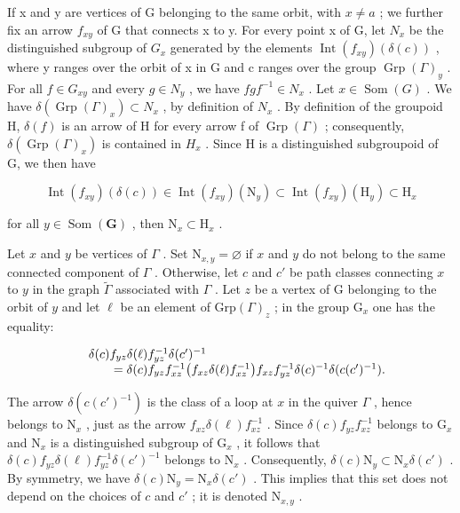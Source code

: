 If x and y are vertices of G belonging to the same orbit, with \(x \neq a\) ; we further fix an arrow \(f_{xy}\) of G that connects x to y. For every point x of G, let \(N_{x}\) be the distinguished subgroup of \(G_{x}\) generated by the elements \(\operatorname{Int}(f_{xy})(\delta(c))\) , where y ranges over the orbit of x in G and c ranges over the group \(\operatorname{Grp}(\Gamma)_{y}\) . For all \(f \in G_{xy}\) and every \(g \in N_{y}\) , we have \(fgf^{-1} \in N_{x}\) . Let \(x \in \operatorname{Som}(G)\) . We have \(\delta(\operatorname{Grp}(\Gamma)_{x}) \subset N_{x}\) , by definition of \(N_{x}\) . By definition of the groupoid H, \(\delta(f)\) is an arrow of H for every arrow f of \(\operatorname{Grp}(\Gamma)\) ; consequently, \(\delta(\operatorname{Grp}(\Gamma)_{x})\) is contained in \(H_{x}\) . Since H is a distinguished subgroupoid of G, we then have

\[
\operatorname{Int} (f _ {x y}) (\delta (c)) \in \operatorname{Int} (f _ {x y}) (\mathrm{N} _ {y}) \subset \operatorname{Int} (f _ {x y}) (\mathrm{H} _ {y}) \subset \mathrm{H} _ {x}
\]

for all \(y \in \operatorname{Som}(\mathbf{G})\) , then \(\mathrm{N}_x \subset \mathrm{H}_x\) .

Let \(x\) and \(y\) be vertices of \(\Gamma\) . Set \(\mathrm{N}_{x,y} = \varnothing\) if \(x\) and \(y\) do not belong to the same connected component of \(\Gamma\) . Otherwise, let \(c\) and \(c'\) be path classes connecting \(x\) to \(y\) in the graph \(\widetilde{\Gamma}\) associated with \(\Gamma\) . Let \(z\) be a vertex of G belonging to the orbit of \(y\) and let \(\ell\) be an element of \(\mathrm{Grp}(\Gamma)_z\) ; in the group \(\mathrm{G}_x\) one has the equality:

\[
\begin{array}{r l} & {\delta (c) f _ {y z} \delta (\ell) f _ {y z} ^ {- 1} \delta (c ^ {\prime}) ^ {- 1}} \\ & {\qquad = \delta (c) f _ {y z} f _ {x z} ^ {- 1} \big (f _ {x z} \delta (\ell) f _ {x z} ^ {- 1} \big) f _ {x z} f _ {y z} ^ {- 1} \delta (c) ^ {- 1} \delta (c (c ^ {\prime}) ^ {- 1}).} \end{array}
\]

The arrow \(\delta(c(c')^{-1})\) is the class of a loop at \(x\) in the quiver \(\Gamma\) , hence belongs to \(\mathrm{N}_x\) , just as the arrow \(f_{xz}\delta(\ell)f_{xz}^{-1}\) . Since \(\delta(c)f_{yz}f_{xz}^{-1}\) belongs to \(\mathrm{G}_x\) and \(\mathrm{N}_x\) is a distinguished subgroup of \(\mathrm{G}_x\) , it follows that \(\delta(c)f_{yz}\delta(\ell)f_{yz}^{-1}\delta(c')^{-1}\) belongs to \(\mathrm{N}_x\) . Consequently, \(\delta(c)\mathrm{N}_y\subset \mathrm{N}_x\delta(c')\) . By symmetry, we have \(\delta(c)\mathrm{N}_y = \mathrm{N}_x\delta(c')\) . This implies that this set does not depend on the choices of \(c\) and \(c'\) ; it is denoted \(\mathrm{N}_{x,y}\) .

